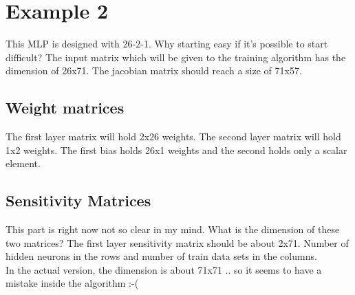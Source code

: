 \section{Example 2}

This MLP is designed with 26-2-1. Why starting easy if it's possible to start difficult?
The input matrix which will be given to the training algorithm has the dimension of 26x71. The jacobian matrix should reach a size of 71x57.

\subsection{Weight matrices}
The first layer matrix will hold 2x26 weights. The second layer matrix will hold 1x2 weights.
The first bias holds 26x1 weights and the second holds only a scalar element.

\subsection{Sensitivity Matrices}
This part is right now not so clear in my mind. What is the dimension of these two matrices?
The first layer sensitivity matrix should be about 2x71. Number of hidden neurons in the rows and number of train data sets in the columns.\\

In the actual version, the dimension is about 71x71 .. so it seems to have a mistake inside the algorithm :-(

